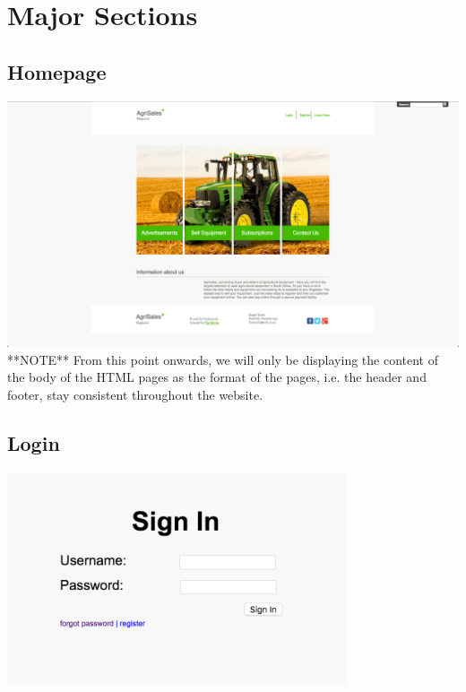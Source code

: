 \documentclass[11pt]{article}
\begin{document}


\tableofcontents

\newpage

\section{Major Sections}
	\subsection{Homepage}
		\includegraphics[width=\textwidth]{../Images/Pages/Homepage} \\
		
		**NOTE** From this point onwards, we will only be displaying the content of the body of the HTML pages as the format of the pages, i.e. the header and footer, stay consistent throughout the website.
		
	\subsection{Login}
	\includegraphics[width=0.75\textwidth]{../Images/Pages/Login}
\end{document}
